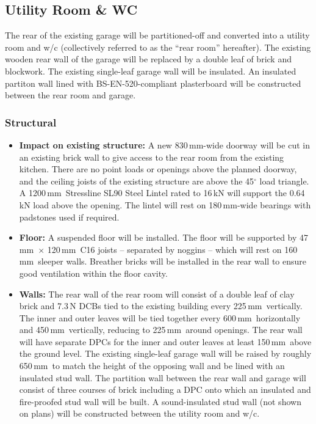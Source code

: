 \documentclass{extension}
\newcommand{\mm}{\,$\mathrm{mm}$}
\begin{document}
\subsection{Utility Room \& WC}
\label{utility}
The rear of the existing garage will be partitioned-off and converted into a utility room and w/c (collectively referred to as the ``rear room'' hereafter). The existing wooden rear wall of the garage will be replaced by a double leaf of brick and blockwork. The existing single-leaf garage wall will be insulated. An insulated partiton wall lined with BS-EN-520-compliant plasterboard\cite{upboard} will be constructed between the rear room and garage.
\subsubsection{Structural}
\begin{itemize}
  \item {\bf Impact on existing structure:} A new 830\mm -wide doorway will be cut in an existing brick wall to give access to the rear room from the existing kitchen. There are no point loads or openings above the planned doorway, and the ceiling joists of the existing structure are above the 45$^\circ$ load triangle. A 1200\mm\ Stressline SL90 Steel Lintel rated to 16\,kN will support the 0.64\,kN load above the opening. The lintel will rest on 180\mm -wide bearings with padstones used if required.
  \item {\bf Floor:} A suspended floor will be installed. The floor will be supported by 47\mm\ $\times$ 120\mm\ C16 joists -- separated by noggins -- which will rest on 160\mm\ sleeper walls. Breather bricks will be installed in the rear wall to ensure good ventilation within the floor cavity.
  \item {\bf Walls:} The rear wall of the rear room will consist of a double leaf of clay brick and 7.3\,N DCBs tied to the existing building every 225\mm\ vertically. The inner and outer leaves will be tied together every 600\mm\ horizontally and 450\mm\ vertically, reducing to 225\mm\ around openings. The rear wall will have separate DPCs for the inner and outer leaves at least 150\mm\ above the ground level. The existing single-leaf garage wall will be raised by roughly 650\mm\ to match the height of the opposing wall and be lined with an insulated stud wall. The partition wall between the rear wall and garage will consist of three courses of brick including a DPC onto which an insulated and fire-proofed stud wall will be built. A sound-insulated stud wall (not shown on plans) will be constructed between the utility room and w/c.

\end{itemize}
\end{document}
